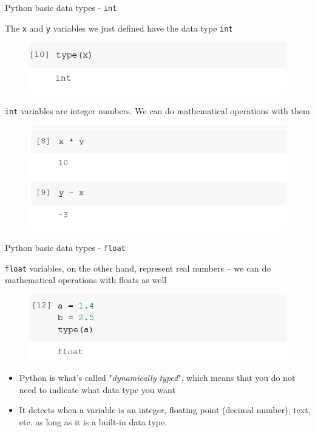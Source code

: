 \documentclass[aspectratio=169]{beamer}
\begin{document}
\begin{frame}{Python basic data types - \texttt{int}}

	The \texttt{x} and \texttt{y} variables we just defined have the data type \texttt{int}

	\begin{figure}
		\centering
		\includegraphics[width=0.6\linewidth]{img/type_int.png}
	\end{figure}

	\texttt{int} variables are integer numbers. We can do mathematical operations with them
	\begin{figure}
		\centering
		\includegraphics[width=0.6\linewidth]{img/math_integers.png}
	\end{figure}

\end{frame}

\begin{frame}{Python basic data types - \texttt{float}}

	\texttt{float} variables, on the other hand, represent real numbers 
	-- we can do mathematical operations with floats as well

	\begin{figure}
		\centering
		\includegraphics[width=0.6\linewidth]{img/type_float.png}
	\end{figure}

	\begin{itemize}	
		\item Python is what's called "\textit{dynamically typed}", 
	which means that you do not need to indicate what data type you want
		\item It detects when a variable is an integer, floating point (decimal number), 
	text, etc. as long as it is a built-in data type.
	\end{itemize}

\end{frame}
\end{document}
